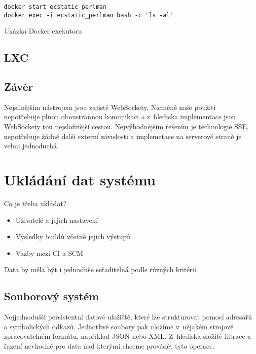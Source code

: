 \begin{listing}[ht]
\begin{verbatim}
docker start ecstatic_perlman
docker exec -i ecstatic_perlman bash -c 'ls -al' 
\end{verbatim}
\caption{Ukázka Docker exekutoru}
\label{docker-minimal-example}
\end{listing}

\subsection{LXC}



\subsection{Závěr}

Nejsilnějším nástrojem jsou zajisté WebSockety.
Nicméně naše použití nepotřebuje plnou oboustrannou komunikaci a z~hlediska implementace jsou WebSockety tou nejsložitější cestou.
Nejvýhodnějším řešením je technologie SSE, nepotřebuje žádné další externí závislosti a implemetace na serverové straně je velmi jednoduchá.


\section{Ukládání dat systému}

Co je třeba ukládat?

\begin{itemize}
	\item Uživatelé a jejich nastavení
	\item Výsledky buildů včetně jejich výstupů
	\item Vazby mezi CI a SCM
\end{itemize}

Data by měla být i jednoduše seřaditelná podle různých kritérií.

\subsection{Souborový systém}

Nejjednodušší persistentní datové uložiště, které lze strukturovat pomocí adresářů a symbolických odkazů.
Jednotlivé soubory pak uložíme v~nějakém strojově zpracovatelném formátu, například JSON nebo XML.
Z~hlediska složité filtrace a řazení nevhodné pro data nad kterými chceme provádět tyto operace.

